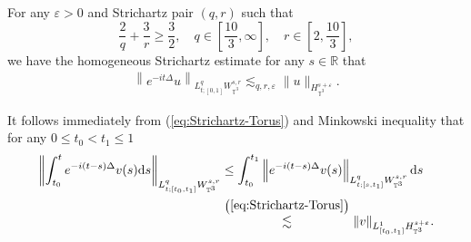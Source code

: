 \begin{thm}
  \label{thm-Strichartz-Torus}For any $\varepsilon > 0$ and Strichartz pair
  $(q, r)$ such that
  \begin{equation}
    \frac{2}{q} + \frac{3}{r} \geqslant \frac{3}{2}, \quad q \in \left[
    \frac{10}{3}, \infty \right], \quad r \in \left[ 2, \frac{10}{3} \right],
    \label{eq:Strichartz-pair}
  \end{equation}
  we have the homogeneous Strichartz estimate for any $s \in \mathbb{R}$ that
  \begin{align}
    \left\| e^{- i t \Delta} u \right\|_{L_{t ; [0, 1]}^q W_{\mathbb{T}^3}^{s, r}}
    \lesssim_{q, r, \varepsilon} \| u \|_{H_{\mathbb{T}^3}^{s + \varepsilon}}
    . \label{eq:Strichartz-Torus}
  \end{align}
\end{thm}

It follows immediately from (\ref{eq:Strichartz-Torus}) and Minkowski
inequality that for any $0 \leqslant t_0 < t_1 \leqslant 1$
\begin{equation}
\begin{split}
  \left\| \int^t_{t_0} e^{- i (t - s) \Delta} v (s) \mathrm{d}s \right\|_{L_{t ;
  [t_0, t_1]}^q W_{\mathbb{T}^3}^{s, r}} &\leq \int^{t_1}_{t_0} \left\| e^{- i (t -
  s) \Delta} v (s) \right\|_{L_{t ; [s, t_1]}^q W_{\mathbb{T}^3}^{s, r}} \mathrm{d}s\\
  & \overset{\left( \ref{eq:Strichartz-Torus} \right)}{\lesssim} \| v
  \|_{L_{[t_0, t_1]}^1 H_{\mathbb{T}^3}^{s + \varepsilon}}.
 \end{split}
\end{equation}

